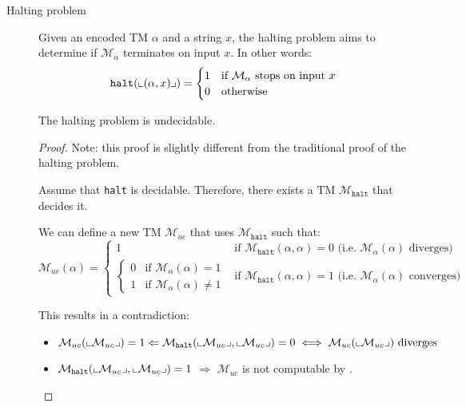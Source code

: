 \begin{description}
    \item[Halting problem] 
        Given an encoded TM $\alpha$ and a string $x$,
        the halting problem aims to determine if $\mathcal{M}_\alpha$ terminates on input $x$.
        In other words:
        \[
            \texttt{halt}({\llcorner{(\alpha, x)}\lrcorner}) = \begin{cases}
                1 & \text{if $\mathcal{M}_\alpha$ stops on input $x$} \\
                0 & \text{otherwise}
            \end{cases}  
        \]
        \begin{theorem}
            The halting problem is undecidable.
        
            \begin{proof}
                Note: this proof is slightly different from the traditional proof of the halting problem.
                
                Assume that \texttt{halt} is decidable. Therefore, there exists a TM $\mathcal{M}_\texttt{halt}$ that decides it.

                We can define a new TM $\mathcal{M}_{uc}$ that uses $\mathcal{M}_\texttt{halt}$ such that:
                \[ \mathcal{M}_{uc}(\alpha) = \begin{cases}
                    1 & \text{if $\mathcal{M}_\texttt{halt}(\alpha, \alpha) = 0$ (i.e. $\mathcal{M}_\alpha(\alpha)$ diverges)} \\
                    \begin{cases}
                        0 & \text{if $\mathcal{M}_\alpha(\alpha) = 1$} \\
                        1 & \text{if $\mathcal{M}_\alpha(\alpha) \neq 1$}
                    \end{cases} & \text{if $\mathcal{M}_\texttt{halt}(\alpha, \alpha) = 1$ (i.e. $\mathcal{M}_\alpha(\alpha)$ converges)}
                \end{cases} \]

                This results in a contradiction:
                \begin{itemize}
                    \item $\mathcal{M}_{uc}({\llcorner{\mathcal{M}_{uc}}\lrcorner}) = 1 \Leftarrow 
                        \mathcal{M}_\texttt{halt}({\llcorner{\mathcal{M}_{uc}}\lrcorner}, {\llcorner{\mathcal{M}_{uc}}\lrcorner}) = 0 \iff
                        \mathcal{M}_{uc}({\llcorner{\mathcal{M}_{uc}}\lrcorner}) \text{ diverges}$
                    \item $\mathcal{M}_\texttt{halt}({\llcorner{\mathcal{M}_{uc}}\lrcorner}, {\llcorner{\mathcal{M}_{uc}}\lrcorner}) = 1$ $\Rightarrow$
                        $\mathcal{M}_{uc}$ is not computable by .
                \end{itemize}
            \end{proof}
        \end{theorem}


\end{description}
